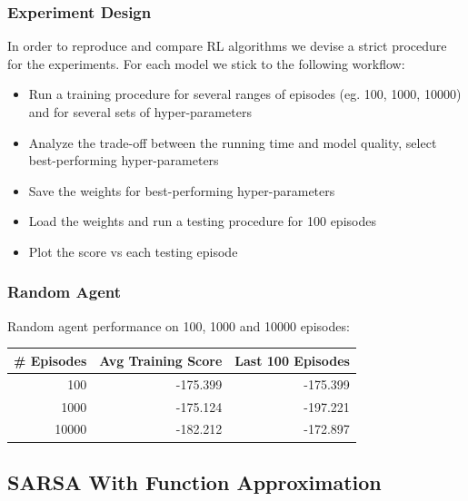 \documentclass{beamer}
\begin{document}
\begin{frame}
\frametitle{Experiment Design}
In order to reproduce and compare RL algorithms we devise 
a strict procedure for the experiments.
For each model we stick to the following workflow:

\begin{itemize}
	\item Run a training procedure for several ranges of episodes (eg. 100, 1000, 10000) and for several sets of hyper-parameters
	
	\item Analyze the trade-off between the running time and 
	model quality, select best-performing hyper-parameters
	
	\item Save the weights for best-performing hyper-parameters
	
	\item Load the weights and run a testing procedure for 100 episodes 
	
	\item Plot the score vs each testing episode
\end{itemize}

\end{frame}

\begin{frame}
\frametitle{Random Agent}
Random agent performance on 100, 1000 and 10000 episodes:

\begin{table}[H]
	\centering
	\begin{tabular}{|r|r|r|}
		\hline
		
		\multicolumn{1}{|l|}{\# Episodes} & \multicolumn{1}{l|}{Avg Training Score} & \multicolumn{1}{l|}{Last 100 Episodes} \\
		\hline
		100   & -175.399 & -175.399 \\
		\hline
		1000  & -175.124 & -197.221 \\
		\hline
		10000 & -182.212 & -172.897 \\
		\hline
	\end{tabular}%
	\label{tab:addlabel}%
\end{table}%



\end{frame}




\subsection{SARSA With Function Approximation}
\end{document}
